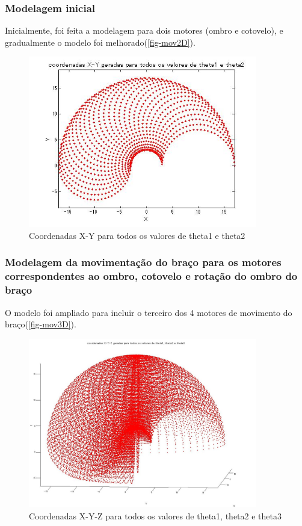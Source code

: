 	\subsubsection{Modelagem inicial}\label{subsubsec-modelageminic}
	Inicialmente, foi feita a modelagem para dois motores (ombro e cotovelo), e gradualmente o modelo foi melhorado(\autoref{fig-mov2D}). \par
	\begin{figure}[!htb]
	\caption{\label{fig-mov2D} Coordenadas X-Y para todos os valores de theta1 e theta2 }
	\begin{center}
		\includegraphics[width=100mm]{2dof.jpg}	
	\end{center}
	\end{figure}

	\subsubsection{Modelagem da movimentação do braço para os motores correspondentes ao ombro, cotovelo e rotação do ombro do braço}\label{subsubsec-modelagem3m}

	O modelo foi ampliado para incluir o terceiro dos 4 motores de movimento do braço(\autoref{fig-mov3D}).\par
	\begin{figure} [!htb]
	\caption{\label{fig-mov3D}  Coordenadas X-Y-Z para todos os valores de theta1, theta2 e theta3 }
	\begin{center}
		\includegraphics[width=100mm]{3dof.jpg}	
	\end{center}
	\end{figure}

